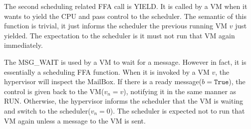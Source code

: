 \documentclass[a4paper]{article}
\newcommand*{\MB}{\text{MailBox}}
\newcommand*{\YIELD}{\text{YIELD}}
\newcommand*{\instr}[1]{\texttt{#1}}
\begin{document}
The second scheduling related FFA call is YIELD. It is called by a VM
when it wants to yield the CPU and pass control to the scheduler. The semantic
of this function is trivial, it just informs the scheduler the previous running VM $v$ just
yielded. The expectation to the scheduler is it must not run that VM again
immediately.


The MSG\_WAIT is used by a VM to wait for a message. However in
fact, it is essentially a scheduling FFA function. When it is invoked
by a VM $v$, the hypervisor will inspect the $\MB$. If there is a ready message($b=\mathtt{True}$), the
control is given back to the VM($v_{n}=v$), notifying it in the same manner as RUN.
Otherwise, the hypervisor informs the scheduler that the VM is waiting and switch to
the scheduler($v_{n}=0$). The scheduler is expected not to run that VM again unless a message
to the VM is sent.



\end{document}
